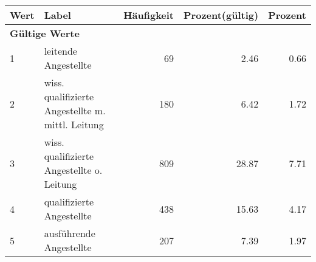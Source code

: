      \begin{longtable}{lXrrr}
     \toprule
     \textbf{Wert} & \textbf{Label} & \textbf{Häufigkeit} & \textbf{Prozent(gültig)} & \textbf{Prozent} \\
     \endhead
     \midrule
     \multicolumn{5}{l}{\textbf{Gültige Werte}}\\

     1 &
     \multicolumn{1}{X}{ leitende Angestellte   } &


       \num{69} &
       \num[round-mode=places,round-precision=2]{2,46} &
         \num[round-mode=places,round-precision=2]{0,66} \\

     2 &
     \multicolumn{1}{X}{ wiss. qualifizierte Angestellte m. mittl. Leitung   } &


       \num{180} &
       \num[round-mode=places,round-precision=2]{6,42} &
         \num[round-mode=places,round-precision=2]{1,72} \\

     3 &
     \multicolumn{1}{X}{ wiss. qualifizierte Angestellte o. Leitung   } &


       \num{809} &
       \num[round-mode=places,round-precision=2]{28,87} &
         \num[round-mode=places,round-precision=2]{7,71} \\

     4 &
     \multicolumn{1}{X}{ qualifizierte Angestellte   } &


       \num{438} &
       \num[round-mode=places,round-precision=2]{15,63} &
         \num[round-mode=places,round-precision=2]{4,17} \\

     5 &
     \multicolumn{1}{X}{ ausführende Angestellte   } &


       \num{207} &
       \num[round-mode=places,round-precision=2]{7,39} &
         \num[round-mode=places,round-precision=2]{1,97} \\


\end{longtable}
